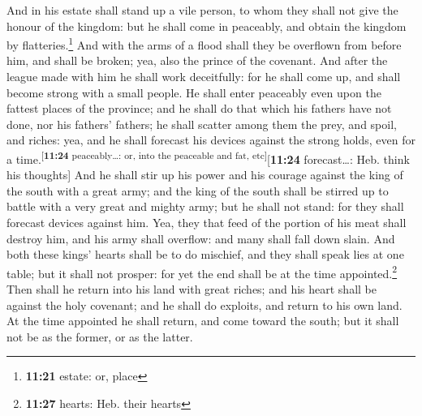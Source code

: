  And in his estate shall stand up a vile person, to whom
they shall not give the honour of the kingdom: but he shall come in
peaceably, and obtain the kingdom by flatteries.\footnote{\textbf{11:21}
  estate: or, place}  And with the arms of a flood shall
they be overflown from before him, and shall be broken; yea, also the
prince of the covenant.  And after the league made with
him he shall work deceitfully: for he shall come up, and shall become
strong with a small people.  He shall enter peaceably
even upon the fattest places of the province; and he shall do that which
his fathers have not done, nor his fathers' fathers; he shall scatter
among them the prey, and spoil, and riches: yea, and he shall forecast
his devices against the strong holds, even for a
time.\textsuperscript{{[}\textbf{11:24} peaceably\ldots: or, into the
peaceable and fat, etc{]}}{[}\textbf{11:24} forecast\ldots: Heb. think
his thoughts{]}  And he shall stir up his power and his
courage against the king of the south with a great army; and the king of
the south shall be stirred up to battle with a very great and mighty
army; but he shall not stand: for they shall forecast devices against
him.  Yea, they that feed of the portion of his meat
shall destroy him, and his army shall overflow: and many shall fall down
slain.  And both these kings' hearts shall be to do
mischief, and they shall speak lies at one table; but it shall not
prosper: for yet the end shall be at the time appointed.\footnote{\textbf{11:27}
  hearts: Heb. their hearts}  Then shall he return into
his land with great riches; and his heart shall be against the holy
covenant; and he shall do exploits, and return to his own land.
 At the time appointed he shall return, and come toward
the south; but it shall not be as the former, or as the latter.

